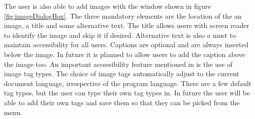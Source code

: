 The user is also able to add images with the window shown in figure \ref{fig:imageDialogBox}. The three mandatory elements are the location of the an image, a title and some alternative text. The title allows users with screen reader to identify the image and skip it if desired. Alternative text is also a must to maintain accessibility for all users. Captions are optional and are always inserted below the image. In future it is planned to allow users to add the caption above the image too. An important accessibility feature mentioned in \cite{augenbitWiki} is the use of image tag types. The choice of image tags automatically adjust to the current document language, irrespective of the program language. There are a few default tag types, but the user can type their own tag types in. In future the user will be able to add their own tags and save them so that they can be picked from the menu.

